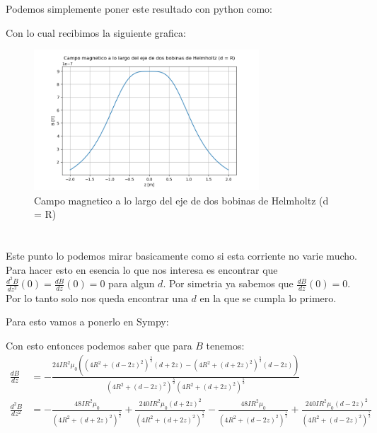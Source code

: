 \documentclass{report}
\begin{document}
\section{}

Podemos simplemente poner este resultado con python como:


Con lo cual recibimos la siguiente grafica:

\begin{figure}[H]
	\begin{center}
		\includegraphics[width=0.75\textwidth]{img/punto_12_b.png}
	\end{center}
	\caption{Campo magnetico a lo largo del eje de dos bobinas de Helmholtz (d = R)}\label{fig:Punto_12_b}
\end{figure}

\section{}

Este punto lo podemos mirar basicamente como si esta corriente no varie mucho. Para hacer esto en esencia lo
que nos interesa es encontrar que $\frac{d^2B}{dz^2}(0) = \frac{dB}{dz}(0) = 0$ para algun $d$. Por simetria ya sabemos
que $\frac{dB}{dz}(0) = 0$. Por lo tanto solo nos queda encontrar una $d$ en la que se cumpla lo primero.

Para esto vamos a ponerlo en Sympy:


Con esto entonces podemos saber que para $B$ tenemos:
\begin{align*}
	\frac{dB}{d z}&= - \frac{24 I R^{2} \mu_{0} \left(\left(4 R^{2} + \left(d - 2 z\right)^{2}\right)^{\frac{5}{2}} \left(d + 2 z\right) - \left(4 R^{2} + \left(d + 2 z\right)^{2}\right)^{\frac{5}{2}} \left(d - 2 z\right)\right)}{\left(4 R^{2} + \left(d - 2 z\right)^{2}\right)^{\frac{5}{2}} \left(4 R^{2} + \left(d + 2 z\right)^{2}\right)^{\frac{5}{2}}}\\
	\frac{d^2 B}{d z^2} &= - \frac{48 I R^{2} \mu_{0}}{\left(4 R^{2} + \left(d + 2 z\right)^{2}\right)^{\frac{5}{2}}} + \frac{240 I R^{2} \mu_{0} \left(d + 2 z\right)^{2}}{\left(4 R^{2} + \left(d + 2 z\right)^{2}\right)^{\frac{7}{2}}} - \frac{48 I R^{2} \mu_{0}}{\left(4 R^{2} + \left(d - 2 z\right)^{2}\right)^{\frac{5}{2}}} + \frac{240 I R^{2} \mu_{0} \left(d - 2 z\right)^{2}}{\left(4 R^{2} + \left(d - 2 z\right)^{2}\right)^{\frac{7}{2}}}
\end{align*}
\end{document}
